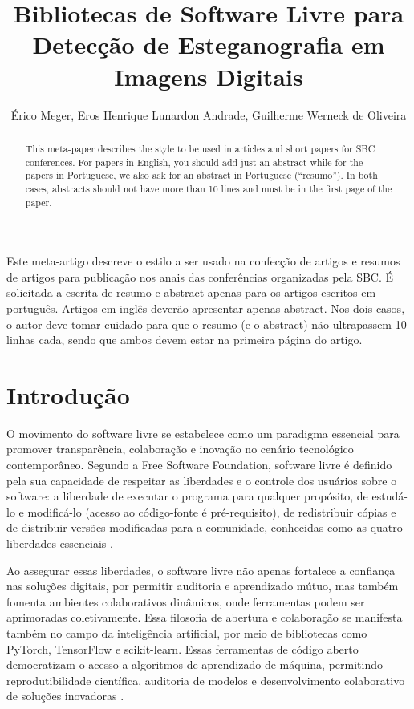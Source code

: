 \documentclass[12pt]{article}
\title{Bibliotecas de Software Livre para Detecção de Esteganografia em Imagens Digitais}
\author{Érico Meger\inst{1}, Eros Henrique Lunardon Andrade\inst{1}, Guilherme Werneck de Oliveira\inst{1}}
\begin{document}
\maketitle

\begin{abstract}
  This meta-paper describes the style to be used in articles and short papers
  for SBC conferences. For papers in English, you should add just an abstract
  while for the papers in Portuguese, we also ask for an abstract in
  Portuguese (``resumo''). In both cases, abstracts should not have more than
  10 lines and must be in the first page of the paper.
\end{abstract}

\begin{resumo}
  Este meta-artigo descreve o estilo a ser usado na confecção de artigos e
  resumos de artigos para publicação nos anais das conferências organizadas
  pela SBC. É solicitada a escrita de resumo e abstract apenas para os artigos
  escritos em português. Artigos em inglês deverão apresentar apenas abstract.
  Nos dois casos, o autor deve tomar cuidado para que o resumo (e o abstract)
  não ultrapassem 10 linhas cada, sendo que ambos devem estar na primeira
  página do artigo.
\end{resumo}

\section{Introdução}

O movimento do software livre se estabelece como um paradigma essencial para
promover transparência, colaboração e inovação no cenário tecnológico
contemporâneo. Segundo a Free Software Foundation, software livre é definido
pela sua capacidade de respeitar as liberdades e o controle dos usuários sobre
o software: a liberdade de executar o programa para qualquer propósito, de
estudá-lo e modificá-lo (acesso ao código-fonte é pré-requisito), de
redistribuir cópias e de distribuir versões modificadas para a comunidade,
conhecidas como as quatro liberdades essenciais \cite{gnu_freesw}.

Ao assegurar essas liberdades, o software livre não apenas fortalece a
confiança nas soluções digitais, por permitir auditoria e aprendizado mútuo,
mas também fomenta ambientes colaborativos dinâmicos, onde ferramentas podem
ser aprimoradas coletivamente. Essa filosofia de abertura e colaboração se
manifesta também no campo da inteligência artificial, por meio de bibliotecas
como PyTorch, TensorFlow e scikit-learn. Essas ferramentas de código aberto
democratizam o acesso a algoritmos de aprendizado de máquina, permitindo
reprodutibilidade científica, auditoria de modelos e desenvolvimento
colaborativo de soluções inovadoras \cite{pytorch_about, tensorflow_about}.
\end{document}
